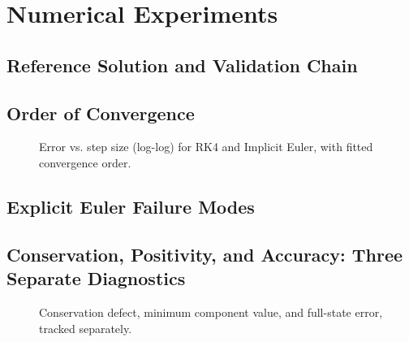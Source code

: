 \documentclass[11pt]{article}
\begin{document}
\section{Numerical Experiments}

\subsection{Reference Solution and Validation Chain}

\subsection{Order of Convergence}
\begin{figure}[h]
  \centering
  \caption{Error vs. step size (log-log) for RK4 and Implicit Euler, with fitted convergence order.}
  \label{fig:convergence}
\end{figure}

\subsection{Explicit Euler Failure Modes}

\subsection{Conservation, Positivity, and Accuracy: Three Separate Diagnostics}
\begin{figure}[h]
  \centering
  \caption{Conservation defect, minimum component value, and full-state error, tracked separately.}
  \label{fig:diagnostics}
\end{figure}
\end{document}
